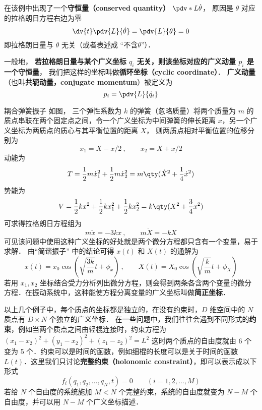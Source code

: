在该例中出现了一个\textbf{守恒量（conserved quantity）} $\pdv*{L}{\dot\theta}$， 原因是 $\theta$ 对应的拉格朗日方程右边为零
\begin{equation}
\dv{t}\pdv{L}{\dot\theta} = \pdv{L}{\theta} = 0
\end{equation}
即拉格朗日量与 $\theta$ 无关（或者表述成 “不含$\theta$”）．

一般地， \textbf{若拉格朗日量与某个广义坐标 $q_i$ 无关，则该坐标对应的广义动量 $p_i$ 是一个守恒量}， 我们把这样的坐标叫做\textbf{循环坐标（cyclic coordinate）}． \textbf{广义动量}（也叫\textbf{共轭动量，conjugate momentum}）被定义为
\begin{equation}\label{Lagrng_eq13}
p_i = \pdv{L}{\dot q_i}
\end{equation}

\begin{example}{耦合弹簧振子}\label{Lagrng_ex2}
如图， 三个弹性系数为 $k$ 的弹簧（忽略质量）将两个质量为 $m$ 的质点串联在两个固定点之间，令一个广义坐标为中间弹簧的伸长距离 $x$，另一个广义坐标为两质点的质心与其平衡位置的距离 $X$， 则两质点相对平衡位置的位移分别为
\begin{equation}
x_1=X-x/2~, \qquad x_2 = X+x/2
\end{equation}
动能为
\begin{equation}
T=\frac12 m\dot x_1^2 + \frac12 m\dot x_2^2 = m \qty(\dot X^2 + \frac14 \dot x^2)
\end{equation}
势能为
\begin{equation}
V = \frac12 k x^2 + \frac12 kx_1^2 + \frac12 k x_2^2 = k\qty(X^2 + \frac34 x^2)
\end{equation}
可求得拉格朗日方程组为
\begin{equation}
m\ddot x =  - 3kx~, \qquad m\ddot X =  - kX
\end{equation}
可见该问题中使用这种广义坐标的好处就是两个微分方程都只含有一个变量，易于求解． 由“简谐振子” 中的结论可得 $x(t)$ 和 $X(t)$ 的通解为
\begin{equation}
x(t) = x_0 \cos(\sqrt{\frac{3k}{m}} t + \phi_x)~,
\qquad
X(t) = X_0 \cos(\sqrt{\frac{k}{m}} t + \phi_X)
\end{equation}
若用 $x_1, x_2$ 坐标结合受力分析列出微分方程，则会得到两条各含两个变量的微分方程．在振动系统中，这种能使方程分离变量的广义坐标叫做\textbf{简正坐标}．%
\end{example}

以上几个例子中，每个质点的坐标都是独立的，在没有约束时，$D$ 维空间中的 $N$ 质点有 $D\times N$ 个独立的广义坐标． 在一些问题中，我们往往会遇到不同形式的\textbf{约束}，例如当两个质点之间由轻棍连接时，约束方程为 $(x_1-x_2)^2+(y_1-x_2)^2+(z_1-z_2)^2=L^2$ 这时两个质点的自由度就由 6 个变为 5 个．约束可以是时间的函数，例如细棍的长度可以是关于时间的函数 $L(t)$．这里我们只讨论\textbf{完整约束（holonomic constraint）}，即可以表示成以下形式
\begin{equation}
f_i(q_1,q_2,\dots ,q_N,t) = 0 \qquad (i = 1,2,\dots,M)
\end{equation}
若给 $N$ 个自由度的系统施加 $M<N$ 个完整约束，系统的自由度就变为 $N-M$ 个自由度，并可以用 $N-M$ 个广义坐标描述．

